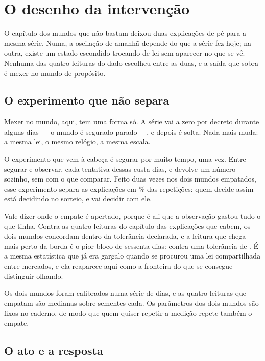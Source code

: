 \chapter{O desenho da intervenção}\label{cap:desenho}

O capítulo dos mundos que não bastam deixou duas explicações de pé para a mesma série. Numa, a oscilação de amanhã
depende do que a série fez hoje; na outra, existe um estado escondido trocando de lei sem aparecer
no que se vê. Nenhuma das quatro leituras do dado escolheu entre as duas, e a saída que sobra é
mexer no mundo de propósito.

\section{O experimento que não separa}

Mexer no mundo, aqui, tem uma forma só. A série vai a zero por decreto durante alguns dias --- o
mundo é segurado parado ---, e depois é solta. Nada mais muda: a mesma lei, o mesmo relógio, a
mesma escala.

O experimento que vem à cabeça é segurar por muito tempo, uma vez. Entre segurar e observar, cada
tentativa dessas custa \numDesenhoDiasPorReplicataMaior{} dias, e devolve um número sozinho, sem
com o que comparar. Feito duas vezes nos dois mundos empatados, esse experimento separa as
explicações em \numDesenhoSeparaPoucasPct\% das repetições: quem decide assim está decidindo no
sorteio, e vai decidir com ele.

Vale dizer onde o empate é apertado, porque é ali que a observação gastou tudo o que tinha. Contra
as quatro leituras do capítulo das explicações que cabem, os dois mundos concordam dentro da
tolerância declarada, e
a leitura que chega mais perto da borda é o pior bloco de sessenta dias:
\numDesenhoEmpatePiorDiferenca{} contra uma tolerância de \numDesenhoEmpateToleranciaPior{}. É a
mesma estatística que já era gargalo quando se procurou uma lei compartilhada entre mercados, e ela
reaparece aqui como a fronteira do que se consegue distinguir olhando.

Os dois mundos foram calibrados numa série de \numDesenhoDiasSerie{} dias, e as quatro leituras que
empatam são medianas sobre \numDesenhoSementesEmpate{} sementes cada. Os parâmetros dos dois mundos
são fixos no caderno, de modo que quem quiser repetir a medição repete também o empate.

\section{O ato e a resposta}

